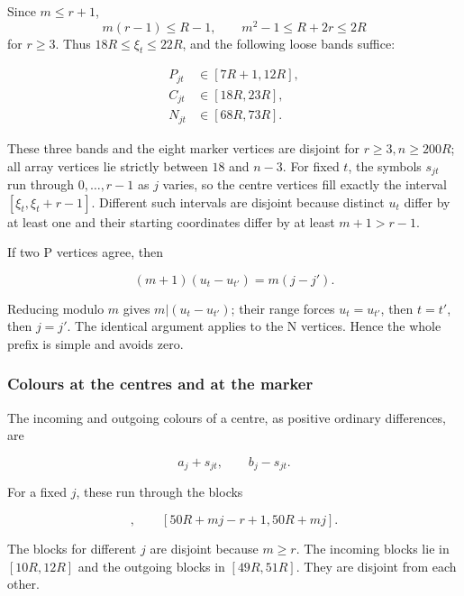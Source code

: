 \documentclass[11pt,a4paper]{article}
\begin{document}
Since \(m\leq r+1\), \[
m(r-1)\le R-1,\qquad m^2-1\le R+2r\le2R
\] for \(r\geq 3\). Thus \(18R\leq \xi _t\leq 22R\), and the following loose bands suffice:

\begin{equation}
\begin{split}
P_{jt}&\in[7R+1,12R],\\
C_{jt}&\in[18R,23R],\\
N_{jt}&\in[68R,73R].
\end{split}
\tag{L8}\label{eq:L8}
\end{equation}

These three bands and the eight marker vertices are disjoint for \(r\geq 3,n\geq 200R\); all array vertices lie strictly between \(18\) and \(n-3\). For fixed \(t\), the symbols \(s_{jt}\) run through \(0,\ldots ,r-1\) as \(j\) varies, so the centre vertices fill exactly the interval \([\xi _t,\xi _t+r-1]\). Different such intervals are disjoint because distinct \(u_t\) differ by at least one and their starting coordinates differ by at least \(m+1>r-1\).

If two P vertices agree, then

\[
(m+1)(u_t-u_{t'})=m(j-j').
\]

Reducing modulo \(m\) gives \(m|(u_t-u_{t'})\); their range forces \(u_t=u_{t'}\), then \(t=t'\), then \(j=j'\). The identical argument applies to the N vertices. Hence the whole prefix is simple and avoids zero.

\hypertarget{colours-at-the-centres-and-at-the-marker}{%
\subsubsection{Colours at the centres and at the marker}\label{colours-at-the-centres-and-at-the-marker}}

The incoming and outgoing colours of a centre, as positive ordinary differences, are

\begin{equation}
a_j+s_{jt},\qquad b_j-s_{jt}.
\tag{L9}\label{eq:L9}
\end{equation}

For a fixed \(j\), these run through the blocks

\begin{equation}
[10R+mj,10R+mj+r-1],\qquad
[50R+mj-r+1,50R+mj].
\tag{L10}\label{eq:L10}
\end{equation}

The blocks for different \(j\) are disjoint because \(m\geq r\). The incoming blocks lie in \([10R,12R]\) and the outgoing blocks in \([49R,51R]\). They are disjoint from each other.
\end{document}
